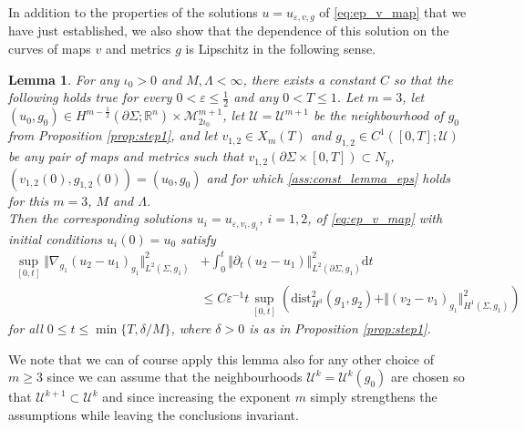 \documentclass[10pt,reqno]{amsart}
\theoremstyle{plain}
\newtheorem{lemma}{Lemma}[section]
\theoremstyle{definition}
\numberwithin{equation}{section}
\newcommand{\de}{\delta}
\newcommand{\La}{\Lambda}
\newcommand{\Si}{\Sigma}
\newcommand{\ep}{\varepsilon}
\newcommand{\R}{\ensuremath{{\mathbb R}}}
\newcommand{\norm}[1]{\Vert#1\Vert}
\newcommand{\beqas}{\begin{equation*}\begin{aligned}}
\newcommand{\eeqas}{\end{aligned}\end{equation*}}
\newcommand{\dd}{\mathrm{d}} %
\newcommand{\eps}{\varepsilon}
\newcommand{\dist}{\text{dist}}
\newcommand{\MM}{\mathcal{M}} %
\newcommand{\UU}{{\mathcal U}}
\newcommand{\hf}{\frac{1}{2}} %
\newcommand{\p}{\partial} %
\newcommand{\MMtwoiota}{\MM_{2\iota_0}}
\begin{document}
In addition to the properties of the solutions $u=u_{\eps,v,g}$ of \eqref{eq:ep_v_map} that we have just established, we also show that the dependence of this solution on the curves of maps $v$ and  metrics $g$ is Lipschitz in the following sense. 
\begin{lemma}\label{lemma:ep_Lip_est}
    For any $\iota_0>0$ and $M,\La<\infty$, there exists a constant $C$ so that the following holds true for every $0<\ep\le\hf$ and any $0<T\le 1$. Let $m=3$, let $(u_0,g_0)\in H^{m-\hf}(\p\Si;\R^n)\times\MMtwoiota^{m+1}$, let $\UU=\UU^{m+1}$ be the neighbourhood of $g_0$ from Proposition \ref{prop:step1}, and let $v_{1,2}\in X_m(T)$ and $g_{1,2}\in C^1([0,T];\UU)$ be any pair of maps and metrics such that $v_{1,2}(\p\Si\times[0,T])\subset N_{\eta}$, $(v_{1,2}(0),g_{1,2}(0)) = (u_0,g_0)$ and for which \eqref{ass:const_lemma_eps} holds for this $m=3$, $M$ and $\La$. 
    \\
    Then the corresponding solutions $u_{i}=u_{\eps,v_i,g_i}$, $i=1,2$, of \eqref{eq:ep_v_map} with initial conditions $u_i(0)=u_0$ satisfy
    \beqas%
        \sup\limits_{[0,t]}\norm{\nabla_{g_1}(u_2-u_1)_{g_1}}_{L^2(\Si,g_1)}^2 & + \int_0^t\norm{\p_t (u_2-u_1)}_{L^2(\p\Si,g_1)}^2 \dd t\\
        &\le C\ep^{-1}t\sup\limits_{[0,t]} \left( \dist ^2_{H^{3}}(g_1,g_2)+\norm{(v_2-v_1)_{{g_1}}}^2_{H^1(\Si,g_1)}\right)
    \eeqas
    for all $0\le t\le\min\{T,\delta/M\}$, where $\de>0$ is as in Proposition \ref{prop:step1}. 
\end{lemma}
We note that we can of course apply this lemma also for any other choice of $m\geq 3$ since we can assume that the neighbourhoods $\UU^k=\UU^k(g_0)$ are chosen so that $\UU^{k+1}\subset \UU^k$ and since increasing the exponent $m$ simply strengthens the assumptions while leaving the conclusions invariant.
\end{document}
